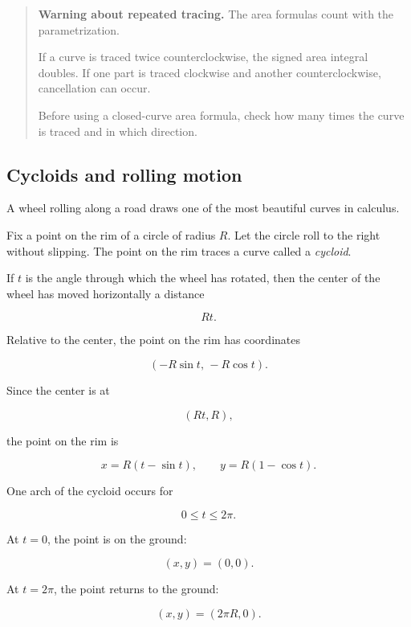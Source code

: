 \begin{quote}
\textbf{Warning about repeated tracing.}
The area formulas count with the parametrization.

If a curve is traced twice counterclockwise, the signed area integral doubles.  If one
part is traced clockwise and another counterclockwise, cancellation can occur.

Before using a closed-curve area formula, check how many times the curve is traced and
in which direction.
\end{quote}

\subsection{Cycloids and rolling motion}
\label{subsec:cycloids-rolling-motion}

A wheel rolling along a road draws one of the most beautiful curves in calculus.

Fix a point on the rim of a circle of radius \(R\).  Let the circle roll to the right without
slipping.  The point on the rim traces a curve called a \emph{cycloid}.

If \(t\) is the angle through which the wheel has rotated, then the center of the wheel has
moved horizontally a distance

\[
Rt.
\]

Relative to the center, the point on the rim has coordinates

\[
(-R\sin t,\,-R\cos t).
\]

Since the center is at

\[
(Rt,R),
\]

the point on the rim is

\[
\boxed{
x=R(t-\sin t),
\qquad
y=R(1-\cos t).
}
\]

One arch of the cycloid occurs for

\[
0\le t\le 2\pi.
\]

At \(t=0\), the point is on the ground:

\[
(x,y)=(0,0).
\]

At \(t=2\pi\), the point returns to the ground:

\[
(x,y)=(2\pi R,0).
\]

